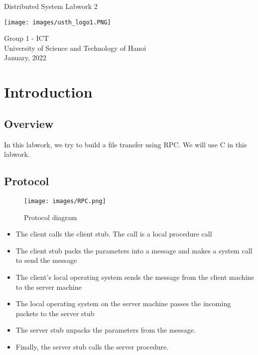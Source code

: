\documentclass[13pt]{article}
\begin{document}
\begin{titlepage}
    \begin{center}
        \vspace*{1.8cm}
        \Large
        Distributed System Labwork 2\\
        \Large
        \vspace{0.5cm}
        \begin{center}
            \texttt{[image: images/usth\_logo1.PNG]}
        \end{center}  
        \vspace{0.5cm}
            Group 1 - ICT\\
        \vspace{0.5cm}
            University of Science and Technology of Hanoi\\
        \vspace{0.5cm}
            January, 2022
        \vfill
          
   \end{center}
\end{titlepage}

\newpage
\tableofcontents
\newpage

\section{Introduction}
\subsection{Overview}
\noindent%
In this labwork, we try to build a file transfer using RPC. We will use C in this labwork.

\subsection{Protocol}

\begin{figure}[h]
    \centering
    \texttt{[image: images/RPC.png]}
    \caption{Protocol diagram}
    \label{fig:protocol}
\end{figure}

\begin{itemize}
    \item The client calls the client stub. The call is a local procedure call
    \item The client stub packs the parameters into a message and makes a system call to send the message
    \item The client's local operating system sends the message from the client machine to the server machine
    \item The local operating system on the server machine passes the incoming packets to the server stub
    \item The server stub unpacks the parameters from the message. 
    \item Finally, the server stub calls the server procedure.
\end{itemize}
\end{document}
